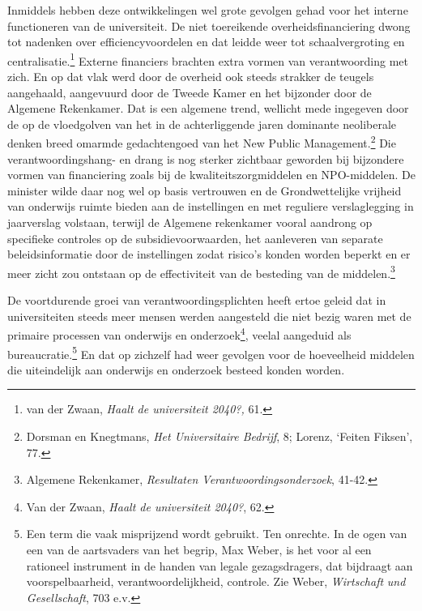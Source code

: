 \documentclass[smallauthor, chapterhaspagenum, nochapterinheader, pagenuminheader,  bigchapnum,medium2, tocpages, garamond, titleinheader]{jote-book}
\begin{document}
	Inmiddels hebben deze ontwikkelingen wel grote gevolgen gehad voor het interne functioneren van de universiteit. De niet toereikende overheidsfinanciering dwong tot nadenken over efficiencyvoordelen en dat leidde weer tot schaalvergroting en centralisatie.\footnote{van der Zwaan, \emph{Haalt de universiteit 2040?,} 61. } Externe financiers brachten extra vormen van verantwoording met zich. En op dat vlak werd door de overheid ook steeds strakker de teugels aangehaald, aangevuurd door de Tweede Kamer en het bijzonder door de Algemene Rekenkamer. Dat is een algemene trend, wellicht mede ingegeven door de op de vloedgolven van het in de achterliggende jaren dominante neoliberale denken breed omarmde gedachtengoed van het New Public Management.\footnote{Dorsman en Knegtmans, \emph{Het Universitaire Bedrijf}, 8; Lorenz, ‘Feiten Fiksen', 77.} Die verantwoordingshang- en drang is nog sterker zichtbaar geworden bij bijzondere vormen van financiering zoals bij de kwaliteitszorgmiddelen en NPO-middelen. De minister wilde daar nog wel op basis vertrouwen en de Grondwettelijke vrijheid van onderwijs ruimte bieden aan de instellingen en met reguliere verslaglegging in jaarverslag volstaan, terwijl de Algemene rekenkamer vooral aandrong op specifieke controles op de subsidievoorwaarden, het aanleveren van separate beleidsinformatie door de instellingen zodat risico's konden worden beperkt en er meer zicht zou ontstaan op de effectiviteit van de besteding van de middelen.\footnote{Algemene Rekenkamer, \emph{Resultaten Verantwoordingsonderzoek}, 41-42.}



	De voortdurende groei van verantwoordingsplichten heeft ertoe geleid dat in universiteiten steeds meer mensen werden aangesteld die niet bezig waren met de primaire processen van onderwijs en onderzoek\footnote{Van der Zwaan, \emph{Haalt de universiteit 2040?}, 62.}, veelal aangeduid als bureaucratie.\footnote{Een term die vaak misprijzend wordt gebruikt. Ten onrechte. In de ogen van een van de aartsvaders van het begrip, Max Weber, is het voor al een rationeel instrument in de handen van legale gezagsdragers, dat bijdraagt aan voorspelbaarheid, verantwoordelijkheid, controle. Zie Weber, \emph{Wirtschaft}\emph{ }\emph{und}\emph{ }\emph{Gesellschaf}\emph{t}, 703 e.v.} En dat op zichzelf had weer gevolgen voor de hoeveelheid middelen die uiteindelijk aan onderwijs en onderzoek besteed konden worden.
\end{document}
